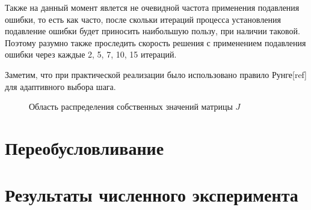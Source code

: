 \documentclass[a4paper,14pt]{extreport}
\begin{document}
  Также на данный момент явлется не очевидной частота применения подавления ошибки, то есть как часто, после скольки итераций процесса установления подавление ошибки будет приносить наибольшую пользу, при наличии таковой. Поэтому разумно также проследить скорость решения с применением подавления ошибки через каждые 2, 5, 7, 10, 15 итераций.
  
  Заметим, что при практической реализации было использовано правило Рунге[ref] для адаптивного выбора шага.
  
    \begin{figure}[H]
	\begin{center}
	\caption{\small Область распределения собственных значений матрицы $J$}
	\label{region_evals}
	\end{center}
	\end{figure}

  
  
  
  \section{Переобусловливание}
  \label{s:test_precondition}

  
  
  
  \section{Результаты численного эксперимента}
  \label{s:results}
  
  
\newpage
\end{document}
